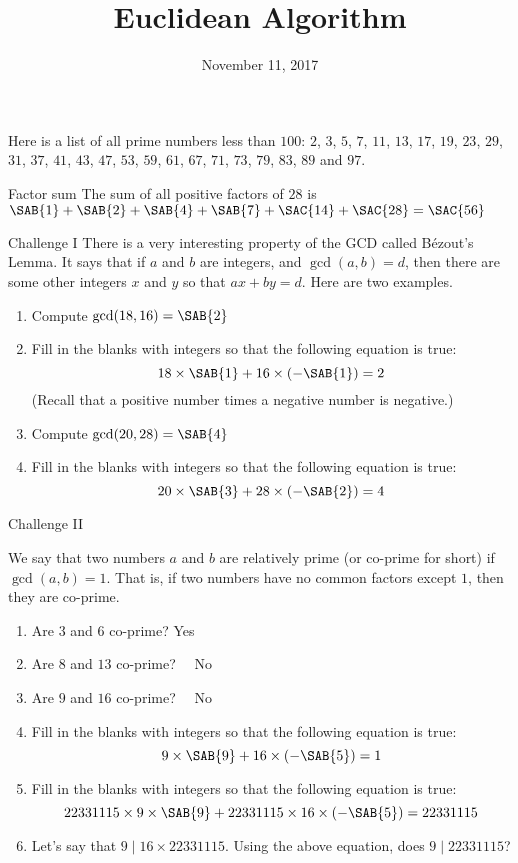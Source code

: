 \documentclass[12pt,letterpaper]{article}
\title{Euclidean Algorithm}
\date{November 11, 2017}
\begin{document}
\maketitle

\thispagestyle{empty}

Here is a list of all prime numbers less than $100$: $2$, $3$, $5$, $7$, $11$,
$13$, $17$, $19$, $23$, $29$, $31$, $37$, $41$, $43$, $47$, $53$, $59$, $61$,
$67$, $71$, $73$, $79$, $83$, $89$ and $97$.

\begin{problem}{Factor sum}
 The sum of all positive factors of $28$ is
 $\SAB{1} +
 \SAB{2} +
 \SAB{4} +
 \SAB{7} +
 \SAC{14} +
 \SAC{28} = \SAC{56}$
\end{problem}

\begin{problem}{Challenge I}
 There is a very interesting property of the GCD called B\'ezout's Lemma. It
 says that if $a$ and $b$ are integers, and $\gcd(a, b) = d$, then there are
 some other integers $x$ and $y$ so that $ax + by = d$. Here are two examples.

 \begin{enumerate}
  \item Compute $\gcd(18, 16) = \SAB{2}$
  \item Fill in the blanks with integers so that the following equation is true:
  \[ 18 \times \SAB{1} + 16 \times (- \SAB{1}) = 2 \]
  (Recall that a positive number times a negative number is negative.)
  \item Compute $\gcd(20, 28) = \SAB{4}$
  \item Fill in the blanks with integers so that the following equation is true:
  \[ 20 \times \SAB{3} + 28 \times (- \SAB{2}) = 4 \]
 \end{enumerate}
\end{problem}

\begin{problem}{Challenge II}

 We say that two numbers $a$ and $b$ are relatively prime (or co-prime for
 short) if $\gcd(a, b) = 1$. That is, if two numbers have no common factors
 except $1$, then they are co-prime.

 \begin{enumerate}
  \item Are $3$ and $6$ co-prime?  \hfill Yes~~
  \item Are $8$ and $13$ co-prime? \hfill {}~~No
  \item Are $9$ and $16$ co-prime? \hfill {}~~No
  \item Fill in the blanks with integers so that the following equation is true:
  \[ 9 \times \SAB{9} + 16 \times (-\SAB{5}) = 1 \]
  \item Fill in the blanks with integers so that the following equation is true:
  \[ 22331115 \times 9 \times \SAB{9} + 22331115 \times 16 \times (-\SAB{5}) =
  22331115 \]
  \item Let's say that $9 \mid 16\times22331115$. Using the above equation,
  does $9\mid22331115$? 
 \end{enumerate}
\end{problem}
\end{document}
